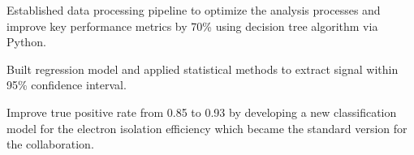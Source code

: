 \documentclass[letterpaper]{deedy-resume-openfont}
\begin{document}
\begin{tightemize}
\item Established data processing pipeline to optimize the analysis processes and improve key performance metrics by 70\% using decision tree algorithm via Python.
\item Built regression model and applied statistical methods to extract signal within 95\% confidence interval.
\item Improve true positive rate from 0.85 to 0.93 by developing a new classification model for the electron isolation efficiency which became the standard version for the collaboration.


\end{tightemize}
\end{document}
